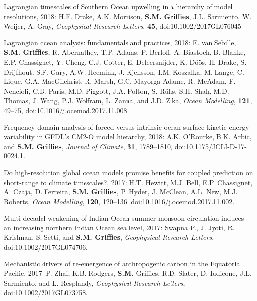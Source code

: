 \begin{etaremune}
\item Lagrangian timescales of Southern Ocean upwelling in a hierarchy of model resolutions, 2018: H.F. Drake, A.K. Morrison, {\bf  S.M. Grif\/f\/ies}, J.L. Sarmiento, W. Weijer, A. Gray, {\it  Geophysical Research Letters}, {\bf 45}, doi:10.1002/2017GL076045

\item  Lagrangian ocean analysis: fundamentals and practices, 2018: E. van Sebille, {\bf S.M. Grif\/f\/ies}, R. Abernathey, T.P. Adams, P. Berloff, A. Biastoch, B. Blanke, E.P. Chassignet, Y. Cheng, C.J. Cotter, E. Deleersnijder, K. {D\"{o}\"{o}̈s}, H. Drake, S. Drijfhout, S.F. Gary, A.W. Heemink, J. Kjellsson, I.M. Koszalka, M. Lange, C. Lique, G.A.  MacGilchrist, R. Marsh, G.C. Mayorga Adame, R. McAdam, F. Nencioli, C.B. Paris, M.D. Piggott, J.A. Polton, S. {R\"{u}hs}, S.H. Shah, M.D. Thomas, J. Wang, P.J. Wolfram, L. Zanna, and J.D. Zika, {\it Ocean Modelling},
{\bf 121}, 49--75,  doi:10.1016/j.ocemod.2017.11.008.

\item Frequency-domain analysis of forced versus intrinsic ocean surface kinetic energy variability in GFDL's CM2-O model hierarchy, 2018: A.K. O'Rourke, B.K. Arbic, and {\bf S.M. Grif\/f\/ies}, {\it Journal of Climate}, {\bf 31}, 1789--1810, doi:10.1175/JCLI-D-17-0024.1.

\item Do high-resolution global ocean models promise benefits for coupled prediction on short-range to climate timescales?, 2017: H.T. Hewitt, M.J. Bell, E.P. Chassignet, A. Czaja, D. Ferreira, {\bf S.M. Grif\/f\/ies}, P. Hyder, J. McClean, A.L. New, M.J. Roberts, {\it Ocean Modelling}, {\bf 120}, 120--136, doi:10.1016/j.ocemod.2017.11.002.

\item Multi-decadal weakening of Indian Ocean summer monsoon circulation induces an increasing northern Indian Ocean sea level, 2017: Swapna P., J. Jyoti, R. Krishnan, S. Setti, and {\bf  S.M. Grif\/f\/ies}, {\it Geophysical Research  Letters}, \newline doi:10.1002/2017GL074706.



\item Mechanistic drivers of re-emergence of anthropogenic carbon in the Equatorial Pacific, 2017: P. Zhai, K.B. Rodgers, {\bf S.M.} Grif\/fies, R.D. Slater, D. Iudicone, J.L. Sarmiento, and L. Resplandy, {\it Geophysical Research Letters}, doi:10.1002/2017GL073758.


\end{etaremune}
